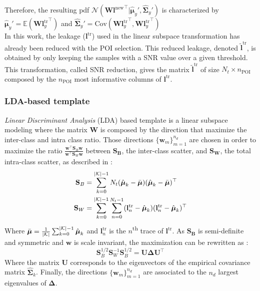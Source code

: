 Therefore, the resulting pdf 
$\mathcal{N}({\mathbf{W}\mathbf{l}^{\text{new}}}^\top|\hat{\boldsymbol{\mu}}_y',\hat{\boldsymbol{\Sigma}}_y')$ 
is characterized by 
$\hat{\boldsymbol{\mu}}_y'=\mathbb{E}({\mathbf{W}\mathbf{l}_y^{\text{tr}}}^\top)$ 
and $\hat{\boldsymbol{\Sigma}}_y' = 
\mathrm{Cov}({\mathbf{W}\mathbf{l}_y^{\text{tr}}}^\top,{\mathbf{W}\mathbf{l}_y^{\text{tr}}}^\top)$\\

In this work, the leakage ($\mathbf{l}^{\text{tr}}$) used in the linear 
subspace transformation has already been reduced with the POI selection. 
This reduced leakage, denoted $\tilde{\mathbf{l}}^{\text{tr}}$, is 
obtained by only keeping the samples with a SNR value over a given 
threshold.
This transformation, called SNR reduction, gives the matrix 
$\tilde{\mathbf{l}}^{\text{tr}}$ of size $N_t\times n_{\text{POI}}$ 
composed by the $n_{\text{POI}}$ most informative columns of 
$\mathbf{l}^{\text{tr}}$.   

\subsubsection{LDA-based template}
\textit{Linear Discriminant Analysis} (LDA) based template is a linear 
subspace modeling where the  matrix $\mathbf{W}$ is composed by the 
direction that maximize the inter-class and intra class ratio. Those 
directions $\bigl\{ \mathbf{w}_m\bigr\}_{m=1}^{n_d}$ are chosen in order 
to maximize the ratio 
$\frac{\mathbf{w}^\top\mathbf{S}_B\mathbf{w}}{\mathbf{w}^\top\mathbf{S}_W\mathbf{w}}$ 
between $\mathbf{S_B}$, the inter-class scatter, and  $\mathbf{S_W}$, the 
total intra-class scatter, as described in \cite{lda_template} :
\begin{align*}
    \mathbf{S}_B &= \sum_{k=0}^{|\mathcal{K}|-1} N_t 
(\hat{\boldsymbol{\mu}}_k - 
\Bar{\boldsymbol{\mu}})(\hat{\boldsymbol{\mu}}_k - 
\Bar{\boldsymbol{\mu}})^\top\\
    \mathbf{S}_W &= \sum_{k=0}^{|\mathcal{K}|-1}\sum_{n=0}^{N_t-1} 
(\mathbf{l}^{\text{tr}}_{n}-\hat{\boldsymbol{\mu}}_k)(\mathbf{l}^{\text{tr}}_{n}-\hat{\boldsymbol{\mu}}_k)^\top
\end{align*}
Where $\Bar{\boldsymbol{\mu}} = 
\frac{1}{|\mathcal{K}|}\sum_{k=0}^{|\mathcal{K}|-1} 
\hat{\boldsymbol{\mu}}_k$ and $\mathbf{l}^{\text{tr}}_{n}$ is the 
$n$\textsuperscript{th} trace of $\mathbf{l}^{\text{tr}}$. As 
$\mathbf{S_B}$ is semi-definite and symmetric and $\mathbf{w}$ is scale 
invariant, the maximization can be rewritten as :
\begin{equation*}
    \mathbf{S}_B^{1/2}\mathbf{S}_W^{-1} \mathbf{S}_B^{1/2} = 
\mathbf{U}\boldsymbol{\Delta}\mathbf{U}^\top
\end{equation*}
Where the matrix $\mathbf{U}$ corresponds to the eigenvectors of the 
empirical covariance matrix $\hat{\boldsymbol{\Sigma}}_k$. Finally, the 
directions $\bigl\{ \mathbf{w}_m\bigr\}_{m=1}^{n_d}$ are associated to the 
$n_d$ largest eigenvalues of $\boldsymbol{\Delta}$.\\

